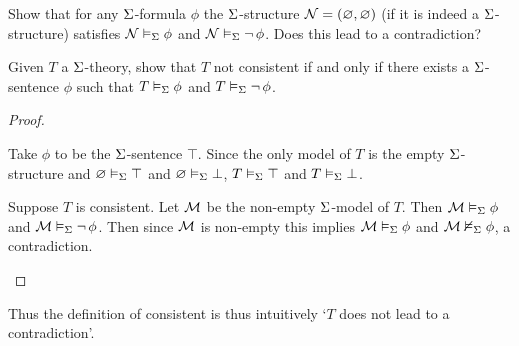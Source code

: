 \begin{ex}
    Show that for any $\Sigma$-formula $\phi$ the $\Sigma$-structure
    $\mathcal{N} = (\varnothing,\varnothing)$ (if it is indeed a $\Sigma$-structure) satisfies
    $\mathcal{N} \vDash_{\Sigma} \phi$ and $\mathcal{N} \vDash_{\Sigma} \neg\, \phi$.
    Does this lead to a contradiction?
\end{ex}

\begin{prop}
    Given $T$ a $\Sigma$-theory, 
    show that $T$ not consistent if and only if there exists a 
    $\Sigma$-sentence $\phi$ such that
    $T \vDash_{\Sigma} \phi$ and $T \vDash_{\Sigma} \neg\, \phi$.
\end{prop}
\begin{proof}
    \begin{forward}
        Take $\phi$ to be the $\Sigma$-sentence $\top$.
        Since the only model of $T$ is the empty $\Sigma$-structure 
        and $\varnothing \vDash_{\Sigma} \top$ and $\varnothing \vDash_{\Sigma} \bot$,
        $T \vDash_{\Sigma} \top$ and $T \vDash_{\Sigma} \bot$.
    \end{forward}
    \begin{backward}
        Suppose $T$ is consistent. 
        Let $\mathcal{M}$ be the non-empty $\Sigma$-model of $T$.
        Then $\mathcal{M} \vDash_{\Sigma} \phi$ and $\mathcal{M} \vDash_{\Sigma} \neg\, \phi$.
        Then since $\mathcal{M}$ is non-empty this implies 
        $\mathcal{M} \vDash_{\Sigma} \phi$ and $\mathcal{M} \nvDash_{\Sigma} \phi$,
        a contradiction.
    \end{backward}
\end{proof}
Thus the definition of consistent is thus intuitively 
`$T$ does not lead to a contradiction'.
